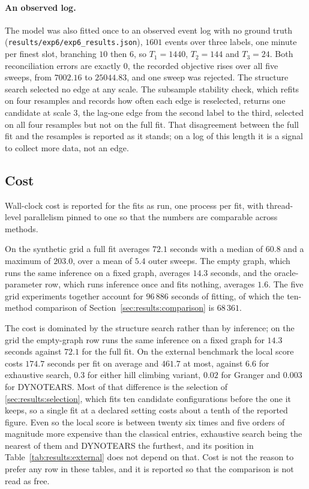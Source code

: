 \paragraph{An observed log.}
The model was also fitted once to an observed event log with no ground truth
(\texttt{results/exp6/exp6\_results.json}), $1601$ events over three labels, one
minute per finest slot, branching $10$ then $6$, so $T_1 = 1440$, $T_2 = 144$
and $T_3 = 24$. Both reconciliation errors are exactly $0$, the recorded
objective rises over all five sweeps, from $7002.16$ to $25044.83$, and one
sweep was rejected. The structure search selected no edge at any scale. The
subsample stability check, which refits on four resamples and records how often
each edge is reselected, returns one candidate at scale $3$, the lag-one edge
from the second label to the third, selected on all four resamples but not on
the full fit. That disagreement between the full fit and the resamples is
reported as it stands; on a log of this length it is a signal to collect more
data, not an edge.



\subsection{Cost}
\label{sec:results:cost}

Wall-clock cost is reported for the fits as run, one process per fit, with
thread-level parallelism pinned to one so that the numbers are comparable
across methods.

On the synthetic grid a full fit averages $72.1$ seconds with a median of
$60.8$ and a maximum of $203.0$, over a mean of $5.4$ outer sweeps. The empty
graph, which runs the same inference on a fixed graph, averages $14.3$ seconds,
and the oracle-parameter row, which runs inference once and fits nothing,
averages $1.6$. The five grid experiments together account for $96\,886$
seconds of fitting, of which the ten-method comparison of
Section~\ref{sec:results:comparison} is $68\,361$.

The cost is dominated by the structure search rather than by inference; on the
grid the empty-graph row runs the same inference on a fixed graph for $14.3$
seconds against $72.1$ for the full fit. On the external benchmark the local
score costs $174.7$ seconds per fit on average and $461.7$ at most, against
$6.6$ for exhaustive search, $0.3$ for either hill climbing variant, $0.02$
for Granger and $0.003$ for DYNOTEARS. Most of that difference is the selection of
\cref{sec:results:selection}, which fits ten candidate configurations before
the one it keeps, so a single fit at a declared setting costs about a tenth of
the reported figure. Even so the local score is between twenty six times and
five orders of magnitude more expensive than the classical entries, exhaustive
search being the nearest of them and DYNOTEARS the furthest, and its position
in Table~\ref{tab:results:external} does not depend on that. Cost is not the
reason to prefer any row in these tables, and it is reported so that the
comparison is not read as free.
